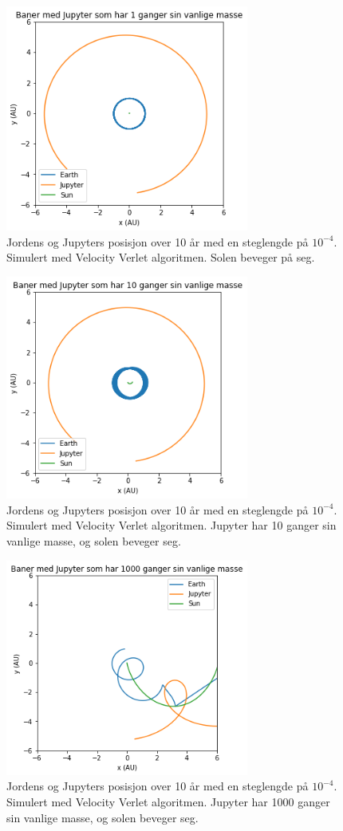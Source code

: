 \documentclass[reprint,english,notitlepage]{revtex4-1}
\begin{document}
	\begin{figure}[H]
		\includegraphics[width=80mm]{../../Code/Figures/j1.png}
		\caption{Jordens og Jupyters posisjon over 10 år med en steglengde på $10^{-4}$. Simulert med Velocity Verlet algoritmen. Solen beveger på seg.}
		\label{fig:j1}
	\end{figure}

	\begin{figure}[H]
		\includegraphics[width=80mm]{../../Code/Figures/j10.png}
		\caption{Jordens og Jupyters posisjon over 10 år med en steglengde på $10^{-4}$. Simulert med Velocity Verlet algoritmen. Jupyter har 10 ganger sin vanlige masse, og solen beveger seg.}
		\label{fig:j10}
	\end{figure}

	\begin{figure}[H]
		\includegraphics[width=80mm]{../../Code/Figures/j1000.png}
		\caption{Jordens og Jupyters posisjon over 10 år med en steglengde på $10^{-4}$. Simulert med Velocity Verlet algoritmen. Jupyter har 1000 ganger sin vanlige masse, og solen beveger seg.}
		\label{fig:j1000}
	\end{figure}
\end{document}
